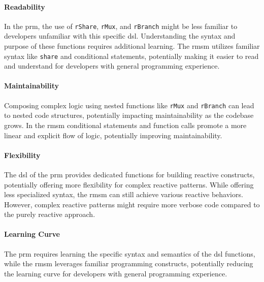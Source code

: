 \paragraph{Readability}

In the \ac{prm}, the use of \texttt{rShare}, \texttt{rMux}, and \texttt{rBranch} might be less familiar to developers unfamiliar with this specific \ac{dsl}. Understanding the syntax and purpose of these functions requires additional learning. The \ac{rmsm} utilizes familiar syntax like \texttt{share} and conditional statements, potentially making it easier to read and understand for developers with general programming experience.

\paragraph{Maintainability}

Composing complex logic using nested functions like \texttt{rMux} and \texttt{rBranch} can lead to nested code structures, potentially impacting maintainability as the codebase grows. In the \ac{rmsm} conditional statements and function calls promote a more linear and explicit flow of logic, potentially improving maintainability.

\paragraph{Flexibility}

The \ac{dsl} of the \ac{prm} provides dedicated functions for building reactive constructs, potentially offering more flexibility for complex reactive patterns. While offering less specialized syntax, the \ac{rmsm} can still achieve various reactive behaviors. However, complex reactive patterns might require more verbose code compared to the purely reactive approach.

\paragraph{Learning Curve}

The \ac{prm} requires learning the specific syntax and semantics of the \ac{dsl} functions, while the \ac{rmsm} leverages familiar programming constructs, potentially reducing the learning curve for developers with general programming experience.




